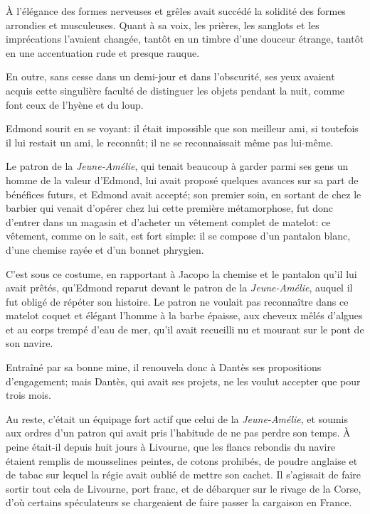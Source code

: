 À l'élégance des formes nerveuses et grêles avait succédé la solidité des formes arrondies et musculeuses. Quant à sa voix, les prières, les sanglots et les imprécations l'avaient changée, tantôt en un timbre d'une douceur étrange, tantôt en une accentuation rude et presque rauque.

En outre, sans cesse dans un demi-jour et dans l'obscurité, ses yeux avaient acquis cette singulière faculté de distinguer les objets pendant la nuit, comme font ceux de l'hyène et du loup.

Edmond sourit en se voyant: il était impossible que son meilleur ami, si toutefois il lui restait un ami, le reconnût; il ne se reconnaissait même pas lui-même.

Le patron de la \textit{Jeune-Amélie}, qui tenait beaucoup à garder parmi ses gens un homme de la valeur d'Edmond, lui avait proposé quelques avances sur sa part de bénéfices futurs, et Edmond avait accepté; son premier soin, en sortant de chez le barbier qui venait d'opérer chez lui cette première métamorphose, fut donc d'entrer dans un magasin et d'acheter un vêtement complet de matelot: ce vêtement, comme on le sait, est fort simple: il se compose d'un pantalon blanc, d'une chemise rayée et d'un bonnet phrygien.

C'est sous ce costume, en rapportant à Jacopo la chemise et le pantalon qu'il lui avait prêtés, qu'Edmond reparut devant le patron de la \textit{Jeune-Amélie}, auquel il fut obligé de répéter son histoire. Le patron ne voulait pas reconnaître dans ce matelot coquet et élégant l'homme à la barbe épaisse, aux cheveux mêlés d'algues et au corps trempé d'eau de mer, qu'il avait recueilli nu et mourant sur le pont de son navire.

Entraîné par sa bonne mine, il renouvela donc à Dantès ses propositions d'engagement; mais Dantès, qui avait ses projets, ne les voulut accepter que pour trois mois.

Au reste, c'était un équipage fort actif que celui de la \textit{Jeune-Amélie}, et soumis aux ordres d'un patron qui avait pris l'habitude de ne pas perdre son temps. À peine était-il depuis huit jours à Livourne, que les flancs rebondis du navire étaient remplis de mousselines peintes, de cotons prohibés, de poudre anglaise et de tabac sur lequel la régie avait oublié de mettre son cachet. Il s'agissait de faire sortir tout cela de Livourne, port franc, et de débarquer sur le rivage de la Corse, d'où certains spéculateurs se chargeaient de faire passer la cargaison en France.

